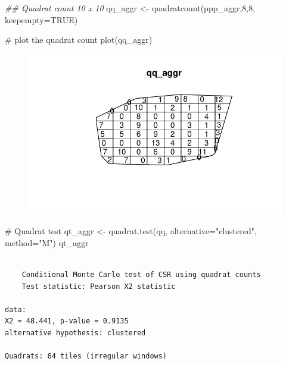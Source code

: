 \documentclass[
  letterpaper,
  DIV=11,
  numbers=noendperiod]{scrreprt}
\newenvironment{Shaded}{\begin{snugshade}}{\end{snugshade}}
\newcommand{\AttributeTok}[1]{\textcolor[rgb]{0.40,0.45,0.13}{#1}}
\newcommand{\CommentTok}[1]{\textcolor[rgb]{0.37,0.37,0.37}{#1}}
\newcommand{\ConstantTok}[1]{\textcolor[rgb]{0.56,0.35,0.01}{#1}}
\newcommand{\DecValTok}[1]{\textcolor[rgb]{0.68,0.00,0.00}{#1}}
\newcommand{\DocumentationTok}[1]{\textcolor[rgb]{0.37,0.37,0.37}{\textit{#1}}}
\newcommand{\FunctionTok}[1]{\textcolor[rgb]{0.28,0.35,0.67}{#1}}
\newcommand{\NormalTok}[1]{\textcolor[rgb]{0.00,0.23,0.31}{#1}}
\newcommand{\OtherTok}[1]{\textcolor[rgb]{0.00,0.23,0.31}{#1}}
\newcommand{\StringTok}[1]{\textcolor[rgb]{0.13,0.47,0.30}{#1}}
\begin{document}
\begin{Shaded}
\begin{Highlighting}[]
\DocumentationTok{\#\# Quadrat count 10 x 10}
\NormalTok{qq\_aggr }\OtherTok{\textless{}{-}} \FunctionTok{quadratcount}\NormalTok{(ppp\_aggr,}\DecValTok{8}\NormalTok{,}\DecValTok{8}\NormalTok{, }\AttributeTok{keepempty=}\ConstantTok{TRUE}\NormalTok{) }

\CommentTok{\# plot the quadrat count}
\FunctionTok{plot}\NormalTok{(qq\_aggr)}
\end{Highlighting}
\end{Shaded}

\begin{figure}[H]

{\centering \includegraphics{spatial-tests_files/figure-pdf/unnamed-chunk-35-2.pdf}

}

\end{figure}

\begin{Shaded}
\begin{Highlighting}[]
\CommentTok{\# Quadrat test}
\NormalTok{qt\_aggr }\OtherTok{\textless{}{-}} \FunctionTok{quadrat.test}\NormalTok{(qq, }\AttributeTok{alternative=}\StringTok{"clustered"}\NormalTok{, }\AttributeTok{method=}\StringTok{"M"}\NormalTok{)}
\NormalTok{qt\_aggr}
\end{Highlighting}
\end{Shaded}

\begin{verbatim}

    Conditional Monte Carlo test of CSR using quadrat counts
    Test statistic: Pearson X2 statistic

data:  
X2 = 48.441, p-value = 0.9135
alternative hypothesis: clustered

Quadrats: 64 tiles (irregular windows)
\end{verbatim}
\end{document}
